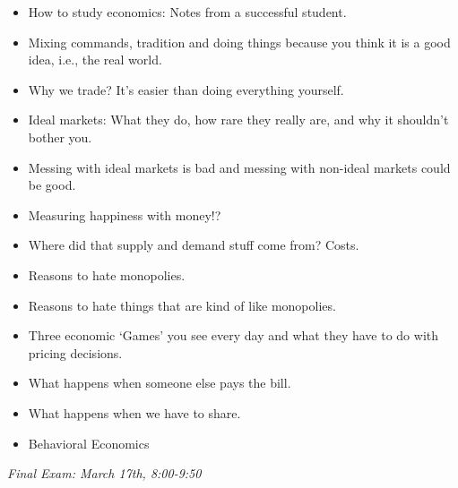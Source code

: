 \documentclass[letterpaper,10pt]{article}
\newcommand{\ExamOne}{Final Exam:  March 17th, 8:00-9:50}
\begin{document}
\begin{itemize}
\item How to study economics: Notes from a successful student.
\item Mixing commands, tradition and doing things because you think it
  is a good idea, i.e., the real world. 
\item Why we trade?  It's easier than doing everything yourself.
\item Ideal markets: What they do, how rare they really are, and why
  it shouldn't bother you.
\item Messing with ideal markets is bad and messing with non-ideal
  markets could be good.
\item Measuring happiness with money!?
\item Where did that supply and demand stuff come from?  Costs.
\item Reasons to hate monopolies.
\item Reasons to hate things that are kind of like monopolies.
\item Three economic `Games' you see every day and what they have to
  do with pricing decisions.
\item What happens when someone else pays the bill.
\item What happens when we have to share.
\item Behavioral Economics
\end{itemize}

\medskip

\centering

\emph{\ExamOne}
\end{document}
